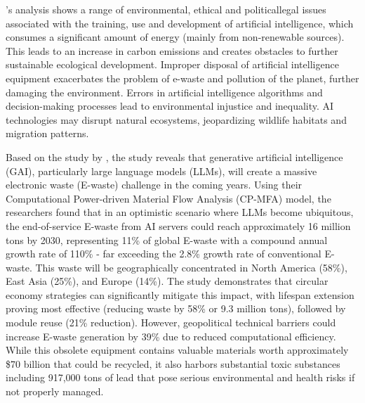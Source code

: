 \documentclass[a4paper, 12pt]{article}
\begin{document}
\citet{Zhuk2023}'s analysis shows a range of environmental, ethical and politicallegal issues associated with the training, use and development of artificial intelligence, which consumes a significant amount of energy (mainly from non-renewable sources). This leads to an increase in carbon emissions and creates obstacles to further sustainable ecological development. Improper disposal of artificial intelligence equipment exacerbates the problem of e-waste and pollution of the planet, further damaging the environment. Errors in artificial intelligence algorithms and decision-making processes
lead to environmental injustice and inequality. AI technologies may disrupt
natural ecosystems, jeopardizing wildlife habitats and migration patterns.\hfill \break

Based on the study by \citet{wang_2024_ewaste}, the study reveals that generative artificial intelligence (GAI), particularly large language models (LLMs), will create a massive electronic waste (E-waste) challenge in the coming years. Using their Computational Power-driven Material Flow Analysis (CP-MFA) model, the researchers found that in an optimistic scenario where LLMs become ubiquitous, the end-of-service E-waste from AI servers could reach approximately 16 million tons by 2030, representing 11\% of global E-waste with a compound annual growth rate of 110\% - far exceeding the 2.8\% growth rate of conventional E-waste. This waste will be geographically concentrated in North America (58\%), East Asia (25\%), and Europe (14\%). The study demonstrates that circular economy strategies can significantly mitigate this impact, with lifespan extension proving most effective (reducing waste by 58\% or 9.3 million tons), followed by module reuse (21\% reduction). However, geopolitical technical barriers could increase E-waste generation by 39\% due to reduced computational efficiency. While this obsolete equipment contains valuable materials worth approximately \$70 billion that could be recycled, it also harbors substantial toxic substances including 917,000 tons of lead that pose serious environmental and health risks if not properly managed.\hfill \break
\end{document}

